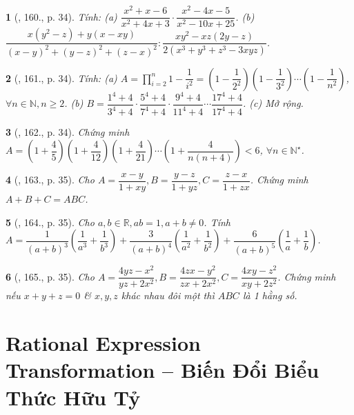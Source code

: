 \documentclass{article}
\newtheorem{baitoan}{}
\begin{document}
\begin{baitoan}[\cite{Tuyen_Toan_8}, 160., p. 34]
	Tính: (a) $\dfrac{x^2 + x - 6}{x^2 + 4x + 3}\cdot\dfrac{x^2 - 4x - 5}{x^2 - 10x + 25}$. (b) $\dfrac{x(y^2 - z) + y(x - xy)}{(x - y)^2 + (y - z)^2 + (z - x)^2}:\dfrac{xy^2 - xz(2y - z)}{2(x^3 + y^3 + z^3 - 3xyz)}$.
\end{baitoan}

\begin{baitoan}[\cite{Tuyen_Toan_8}, 161., p. 34]
	Tính: (a) $A = \prod_{i=2}^n 1 - \dfrac{1}{i^2} = \left(1 - \dfrac{1}{2^2}\right)\left(1 - \dfrac{1}{3^2}\right)\cdots\left(1 - \dfrac{1}{n^2}\right)$, $\forall n\in\mathbb{N},n\ge2$. (b) $B = \dfrac{1^4 + 4}{3^4 + 4}\cdot\dfrac{5^4 + 4}{7^4 + 4}\cdot\dfrac{9^4 + 4}{11^4 + 4}\cdots\dfrac{17^4 + 4}{17^4 + 4}$. (c) Mở rộng.
\end{baitoan}

\begin{baitoan}[\cite{Tuyen_Toan_8}, 162., p. 34]
	Chứng minh $A = \left(1 + \dfrac{4}{5}\right)\left(1 + \dfrac{4}{12}\right)\left(1 + \dfrac{4}{21}\right)\cdots\left(1 + \dfrac{4}{n(n + 4)}\right) < 6$, $\forall n\in\mathbb{N}^\star$.
\end{baitoan}

\begin{baitoan}[\cite{Tuyen_Toan_8}, 163., p. 35]
	Cho $A = \dfrac{x - y}{1 + xy},B = \dfrac{y - z}{1 + yz},C = \dfrac{z - x}{1 + zx}$. Chứng minh $A + B + C = ABC$.
\end{baitoan}

\begin{baitoan}[\cite{Tuyen_Toan_8}, 164., p. 35]
	Cho $a,b\in\mathbb{R},ab = 1,a + b\ne0$. Tính $A = \dfrac{1}{(a + b)^3}\left(\dfrac{1}{a^3} + \dfrac{1}{b^3}\right) + \dfrac{3}{(a + b)^4}\left(\dfrac{1}{a^2} + \dfrac{1}{b^2}\right) + \dfrac{6}{(a + b)^5}\left(\dfrac{1}{a} + \dfrac{1}{b}\right)$.
\end{baitoan}

\begin{baitoan}[\cite{Tuyen_Toan_8}, 165., p. 35]
	Cho $A = \dfrac{4yz - x^2}{yz + 2x^2},B = \dfrac{4zx - y^2}{zx + 2x^2},C = \dfrac{4xy - z^2}{xy + 2z^2}$. Chứng minh nếu $x + y + z = 0$ \& $x,y,z$ khác nhau đôi một thì $ABC$ là 1 hằng số.
\end{baitoan}


\section{Rational Expression Transformation -- Biến Đổi Biểu Thức Hữu Tỷ}
\end{document}
